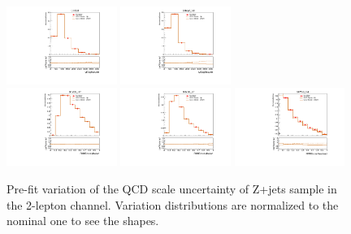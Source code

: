 \begin{figure}[H]
\begin{center}
 \includegraphics[width=0.32\textwidth,keepaspectratio]{figures/syst/QCDScale/Z_0ptag1pfat0pjet_0ptv_CRVjet_MTagMerJets_SysTheoryQCD_Z__1up_Norm.pdf}
 \includegraphics[width=0.32\textwidth,keepaspectratio]{figures/syst/QCDScale/Z_0ptag2pjet_0ptv_CRVjet_Fid_MTagResJets_SysTheoryQCD_Z__1up_Norm.pdf}
 \\
 \includegraphics[width=0.32\textwidth,keepaspectratio]{figures/syst/QCDScale/Z_0ptag1pfat0pjet_0ptv_SRVBS_HP_RNNScoreMerged_SysTheoryQCD_Z__1up_Norm.pdf}
 \includegraphics[width=0.32\textwidth,keepaspectratio]{figures/syst/QCDScale/Z_0ptag1pfat0pjet_0ptv_SRVBS_LP_RNNScoreMerged_SysTheoryQCD_Z__1up_Norm.pdf}
 \includegraphics[width=0.32\textwidth,keepaspectratio]{figures/syst/QCDScale/Z_0ptag2pjet_0ptv_SRVBS_Fid_RNNScoreResolved_SysTheoryQCD_Z__1up_Norm.pdf}
 \caption[f]{
Pre-fit variation of the QCD scale uncertainty of Z+jets sample in the 2-lepton channel.  Variation distributions are normalized to the nominal one to see the shapes.
}
\label{fig:QCDZ}
\end{center}
\end{figure}
